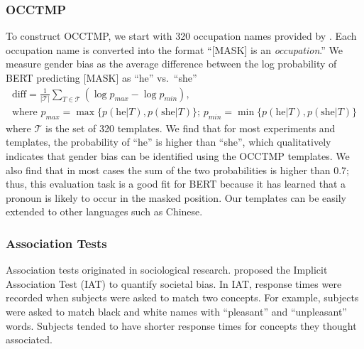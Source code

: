 \subsubsection{OCCTMP}
To construct OCCTMP, we start with 320 occupation names %
provided by . Each occupation name is converted into the format ``[MASK] is an \textit{occupation}.''
We measure gender bias as the average difference between the log probability of BERT predicting [MASK] as ``he'' vs.\ ``she''
\begin{gather*}
\text{diff}=\frac{1}{|{\mathcal T}|} \sum_{T \in
	{\mathcal T}}(\log p_{max} - \log p_{min}),\\
\mbox{where }p_{max}=\max\{p(\mbox{he}| T),p(\mbox{she}| T)\} \mbox{; }p_{min}=\min\{p(\mbox{he}| T),p(\mbox{she}| T)\}
\end{gather*}
where $\mathcal T$ is the set of 320 templates.  We find
that for most experiments and templates, the probability of
``he'' is higher than ``she'', which qualitatively indicates
that gender bias can be identified using the OCCTMP templates. We also find that in most cases the sum of the two probabilities is higher than 0.7; thus, this evaluation task is a good fit for BERT because it has learned that a pronoun is likely to occur in the masked position. Our templates can be easily extended to other languages such as Chinese.

\subsubsection{Association Tests}\label{sec:weat}
Association tests originated in sociological research.  proposed the Implicit Association Test (IAT) to quantify societal bias. In IAT, response times were recorded when subjects were asked to match two concepts. For example, subjects were asked to match black and white names with “pleasant” and “unpleasant” words. Subjects tended to have shorter response times for concepts they thought associated. 

